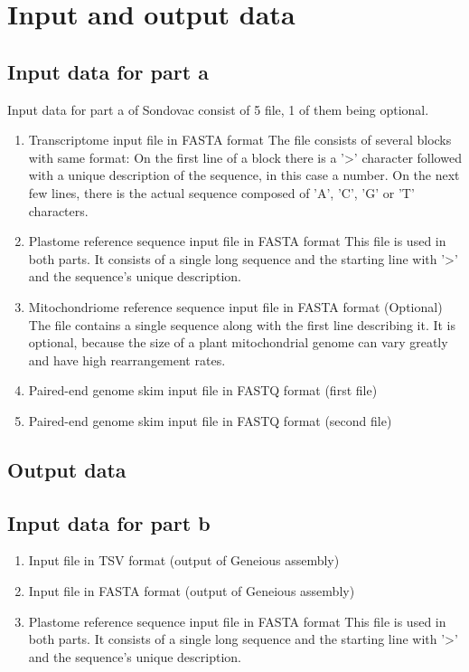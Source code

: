 \section{Input and output data}

\subsection{Input data for part a}
Input data for part a of Sondovac consist of 5 file, 1 of them being optional. 
\begin{enumerate}
\item Transcriptome input file in FASTA format
The file consists of several blocks with same format: On the first line of a block there is a '>' character followed 
with a unique description of the sequence, in this case a number. On the next few lines, there is the actual sequence 
composed of 'A', 'C', 'G' or 'T' characters. 
\item Plastome reference sequence input file in FASTA format
This file is used in both parts. It consists of a single long sequence and the starting line with '>' and the sequence's 
unique description. 
\item Mitochondriome reference sequence input file in FASTA format (Optional)
The file contains a single sequence along with the first line describing it. It is optional, because the size of a plant
mitochondrial genome can vary greatly and have high rearrangement rates. 
\item Paired-end genome skim input file in FASTQ format (first file)
\item Paired-end genome skim input file in FASTQ format (second file)
\end{enumerate}
\subsection{Output data}

\subsection{Input data for part b}
\begin{enumerate}
\item Input file in TSV format (output of Geneious assembly)
\item Input file in FASTA format (output of Geneious assembly)
\item Plastome reference sequence input file in FASTA format
This file is used in both parts. It consists of a single long sequence and the starting line with '>' and the sequence's 
unique description. 
\end{enumerate}
